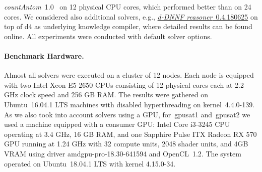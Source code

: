 \documentclass{llncs}
\newcommand{\cSAT}{\textsc{\#Sat}\xspace}%
\newcommand{\WMC}{\textsc{WMC}\xspace}%
\newcommand{\gpusatnu}{{\small\textsf{gpusat2}}\xspace}
\newcommand{\gpusatnuv}[1]{{\small\textsf{gpusat2({\textit{#1}})}}\xspace}
\newcommand{\gpusatone}{{\small\textsf{gpusat1}}\xspace}
\begin{document}
\textit{countAntom}~1.0~\cite{BurchardSchubertBecker15a} on 12 physical CPU
cores, which performed better than on 24 cores.
%
%
%
%
%
%
%
%
We considered also additional solvers, e.g., %
\href{http://www.cril.univ-artois.fr/kc/ressources/query-dnnf-0.4.180625.zip}{\textit{d-DNNF
    reasoner}~0.4.180625} on top of d4 as underlying knowledge
compiler, where detailed results can be found online. %
All experiments were conducted with default solver options.
%
%
%
%
%
%
%
%
%



%

\paragraph{Benchmark Hardware.}
%
%
%
%
Almost all solvers were executed on a cluster of 12 nodes. Each node is equipped
with two Intel Xeon E5-2650 CPUs consisting of 12 physical cores each
at 2.2 GHz clock speed and 256 GB RAM. %
The results were gathered on Ubuntu~16.04.1 LTS machines with disabled hyperthreading
on kernel~4.4.0-139. %
%
%
As we also took into account solvers using a GPU, 
for~\gpusatone and~\gpusatnu we used a machine equipped with a consumer GPU:
%
Intel Core i3-3245 CPU operating at 3.4 GHz, 16 GB RAM, and one
Sapphire Pulse ITX Radeon RX 570 GPU running at 1.24 GHz with 32
compute units, 2048 shader units, and 4GB VRAM using driver
amdgpu-pro-18.30-641594 and OpenCL~1.2.
The system operated on Ubuntu~18.04.1 LTS with kernel 4.15.0-34.
%
\end{document}
